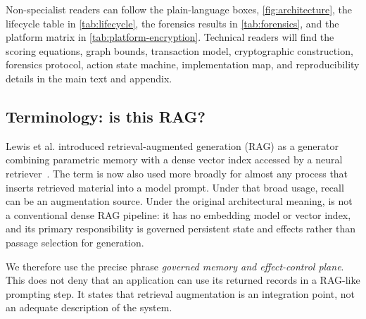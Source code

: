 Non-specialist readers can follow the plain-language boxes, \cref{fig:architecture}, the lifecycle table in \cref{tab:lifecycle}, the forensics results in \cref{tab:forensics}, and the platform matrix in \cref{tab:platform-encryption}. Technical readers will find the scoring equations, graph bounds, transaction model, cryptographic construction, forensics protocol, action state machine, implementation map, and reproducibility details in the main text and appendix.

\subsection{Terminology: is this RAG?}

Lewis et al. introduced retrieval-augmented generation (RAG) as a generator combining parametric memory with a dense vector index accessed by a neural retriever~\cite{lewis2020rag}. The term is now also used more broadly for almost any process that inserts retrieved material into a model prompt. Under that broad usage, \system{} recall can be an augmentation source. Under the original architectural meaning, \system{} is not a conventional dense RAG pipeline: it has no embedding model or vector index, and its primary responsibility is governed persistent state and effects rather than passage selection for generation.

We therefore use the precise phrase \emph{governed memory and effect-control plane}. This does not deny that an application can use its returned records in a RAG-like prompting step. It states that retrieval augmentation is an integration point, not an adequate description of the system.

